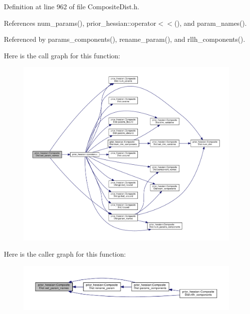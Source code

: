 Definition at line 962 of file Composite\+Dist.\+h.



References num\+\_\+params(), prior\+\_\+hessian\+::operator$<$$<$(), and param\+\_\+names().



Referenced by params\+\_\+components(), rename\+\_\+param(), and rllh\+\_\+components().



Here is the call graph for this function\+:\nopagebreak
\begin{figure}[H]
\begin{center}
\leavevmode
\includegraphics[width=350pt]{classprior__hessian_1_1CompositeDist_a38c4fdacf927824117d202422b04013c_cgraph}
\end{center}
\end{figure}




Here is the caller graph for this function\+:\nopagebreak
\begin{figure}[H]
\begin{center}
\leavevmode
\includegraphics[width=350pt]{classprior__hessian_1_1CompositeDist_a38c4fdacf927824117d202422b04013c_icgraph}
\end{center}
\end{figure}


